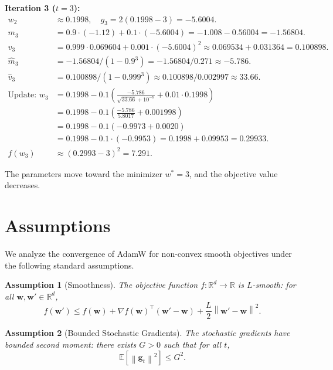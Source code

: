 \documentclass{article}
\theoremstyle{plain}
\newtheorem{assumption}{Assumption}
\theoremstyle{definition}
\renewcommand{\vec}[1]{\boldsymbol{#1}}
\newcommand{\norm}[1]{\left\| #1 \right\|}
\newcommand{\expect}[1]{\mathbb{E}\left[ #1 \right]}
\newcommand{\R}{\mathbb{R}}
\begin{document}
\textbf{Iteration 3 ($t=3$):}
\begin{align*}
    w_2 &\approx 0.1998, \quad g_3 = 2(0.1998 - 3) = -5.6004. \\
    m_3 &= 0.9 \cdot (-1.12) + 0.1 \cdot (-5.6004) = -1.008 - 0.56004 = -1.56804. \\
    v_3 &= 0.999 \cdot 0.069604 + 0.001 \cdot (-5.6004)^2 \approx 0.069534 + 0.031364 = 0.100898. \\
    \hat{m}_3 &= -1.56804 / (1 - 0.9^3) = -1.56804 / 0.271 \approx -5.786. \\
    \hat{v}_3 &= 0.100898 / (1 - 0.999^3) \approx 0.100898 / 0.002997 \approx 33.66. \\
    \text{Update: } w_3 &= 0.1998 - 0.1 \left( \frac{-5.786}{\sqrt{33.66} + 10^{-8}} + 0.01 \cdot 0.1998 \right) \\
    &= 0.1998 - 0.1 \left( \frac{-5.786}{5.8017} + 0.001998 \right) \\
    &= 0.1998 - 0.1 \left( -0.9973 + 0.0020 \right) \\
    &= 0.1998 - 0.1 \cdot (-0.9953) = 0.1998 + 0.09953 = 0.29933. \\
    f(w_3) &\approx (0.2993 - 3)^2 = 7.291.
\end{align*}

The parameters move toward the minimizer $w^* = 3$, and the objective value decreases.

\section*{Assumptions}

We analyze the convergence of AdamW for non-convex smooth objectives under the following standard assumptions.

\begin{assumption}[Smoothness] \label{asm:smooth}
The objective function $f: \R^d \to \R$ is $L$-smooth: for all $\vec{w}, \vec{w}' \in \R^d$,
\begin{equation}
    f(\vec{w}') \le f(\vec{w}) + \nabla f(\vec{w})^\top (\vec{w}' - \vec{w}) + \frac{L}{2} \norm{\vec{w}' - \vec{w}}^2.
\end{equation}
\end{assumption}

\begin{assumption}[Bounded Stochastic Gradients] \label{asm:bounded_grad}
The stochastic gradients have bounded second moment: there exists $G > 0$ such that for all $t$,
\begin{equation}
    \expect{\norm{\vec{g}_t}^2} \le G^2.
\end{equation}
\end{assumption}
\end{document}
